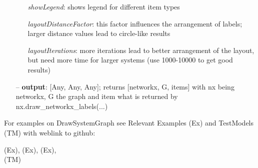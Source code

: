 \begin{itemize}[leftmargin=0.7cm]
\begin{itemize}[leftmargin=1.2cm]
\item[]{\it showLegend}: shows legend for different item types
\item[]{\it layoutDistanceFactor}: this factor influences the arrangement of labels; larger distance values lead to circle-like results
\item[]{\it layoutIterations}: more iterations lead to better arrangement of the layout, but need more time for larger systems (use 1000-10000 to get good results)
\end{itemize}
\item[--]
{\bf output}: [Any, Any, Any]; returns [networkx, G, items] with nx being networkx, G the graph and item what is returned by nx.draw\_networkx\_labels(...)
\vspace{12pt}\end{itemize}
%

%
\noindent For examples on DrawSystemGraph see Relevant Examples (Ex) and TestModels (TM) with weblink to github:
\bi
 \item \footnotesize {} (Ex), 
 (Ex), 
 (Ex), 
\\  (TM)
\ei

%
